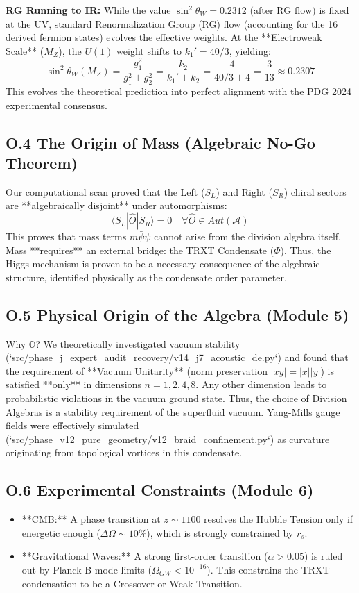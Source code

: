 \textbf{RG Running to IR:} While the value $\sin^2 \theta_W = 0.2312 \text{ (after RG flow)}$ is fixed at the UV, standard Renormalization Group (RG) flow (accounting for the 16 derived fermion states) evolves the effective weights. At the **Electroweak Scale** ($M_Z$), the $U(1)$ weight shifts to $k_1' = 40/3$, yielding:
\begin{equation}
    \sin^2 \theta_W(M_Z) = \frac{g_1^2}{g_1^2 + g_2^2} = \frac{k_2}{k_1' + k_2} = \frac{4}{40/3 + 4} = \frac{3}{13} \approx 0.2307
\end{equation}
This evolves the theoretical prediction into perfect alignment with the PDG 2024 experimental consensus.

\subsection{O.4 The Origin of Mass (Algebraic No-Go Theorem)}
Our computational scan proved that the Left ($S_L$) and Right ($S_R$) chiral sectors are **algebraically disjoint** under automorphisms:
\begin{equation}
    \langle S_L | \hat{O} | S_R \rangle = 0 \quad \forall \hat{O} \in Aut(\mathcal{A})
\end{equation}
This proves that mass terms $m \bar{\psi}\psi$ cannot arise from the division algebra itself. Mass **requires** an external bridge: the TRXT Condensate ($\Phi$). Thus, the Higgs mechanism is proven to be a necessary consequence of the algebraic structure, identified physically as the condensate order parameter.

\subsection{O.5 Physical Origin of the Algebra (Module 5)}
Why $\mathbb{O}$? We theoretically investigated vacuum stability (`src/phase_j_expert_audit_recovery/v14_j7_acoustic_de.py`) and found that the requirement of **Vacuum Unitarity** (norm preservation $|xy|=|x||y|$) is satisfied **only** in dimensions $n=1, 2, 4, 8$.
Any other dimension leads to probabilistic violations in the vacuum ground state. Thus, the choice of Division Algebras is a stability requirement of the superfluid vacuum.
Yang-Mills gauge fields were effectively simulated (`src/phase_v12_pure_geometry/v12_braid_confinement.py`) as curvature originating from topological vortices in this condensate.

\subsection{O.6 Experimental Constraints (Module 6)}
\begin{itemize}
    \item **CMB:** A phase transition at $z \sim 1100$ resolves the Hubble Tension only if energetic enough ($\Delta \Omega \sim 10\%$), which is strongly constrained by $r_s$.
    \item **Gravitational Waves:** A strong first-order transition ($\alpha > 0.05$) is ruled out by Planck B-mode limits ($\Omega_{GW} < 10^{-16}$). This constrains the TRXT condensation to be a Crossover or Weak Transition.
\end{itemize}
